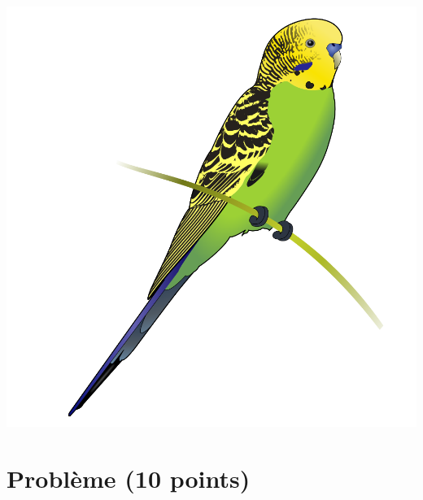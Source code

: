 \documentclass[11pt,a4paper]{article}
\begin{document}
\bigskip

\bigskip

\bigskip


\vfillFirst

\begin{center}
\includegraphics[scale=0.2]{img/others/Budgerigar_diagram.png}
\end{center}

\vfillLast

\clearpage


\section{Problème (10 points)}

\end{document}

